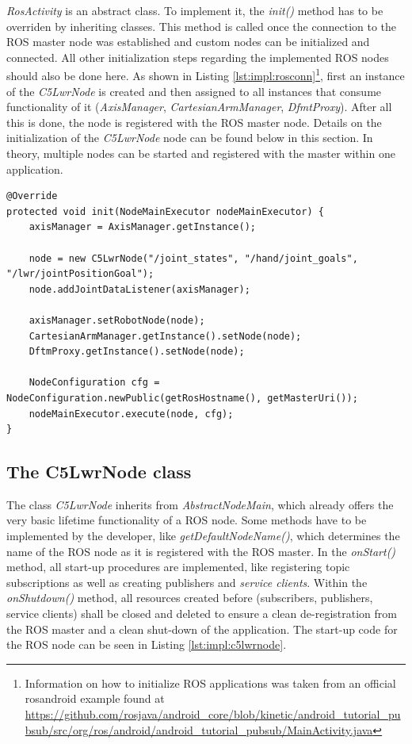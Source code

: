\textit{RosActivity} is an abstract class. To implement it, the \textit{init()} method has to be overriden by inheriting classes. This method is called once the connection to the ROS master node was established and custom nodes can be initialized and connected. All other initialization steps regarding the implemented ROS nodes should also be done here. As shown in Listing \ref{lst:impl:rosconn}\footnote{Information on how to initialize ROS applications was taken from an official rosandroid example found at \url{https://github.com/rosjava/android_core/blob/kinetic/android_tutorial_pubsub/src/org/ros/android/android_tutorial_pubsub/MainActivity.java}}, first an instance of the \textit{C5LwrNode} is created and then assigned to all instances that consume functionality of it (\textit{AxisManager}, \textit{CartesianArmManager}, \textit{DfmtProxy}). After all this is done, the node is registered with the ROS master node. Details on the initialization of the \textit{C5LwrNode} node can be found below in this section. In theory, multiple nodes can be started and registered with the master within one application.

\begin{lstlisting}[caption={Initialization of the ROS connection}, label={lst:impl:rosconn}]
@Override
protected void init(NodeMainExecutor nodeMainExecutor) {
	axisManager = AxisManager.getInstance();
	
	node = new C5LwrNode("/joint_states", "/hand/joint_goals", "/lwr/jointPositionGoal");
	node.addJointDataListener(axisManager);
	
	axisManager.setRobotNode(node);
	CartesianArmManager.getInstance().setNode(node);
	DftmProxy.getInstance().setNode(node);

	NodeConfiguration cfg = NodeConfiguration.newPublic(getRosHostname(), getMasterUri());
	nodeMainExecutor.execute(node, cfg);
}
\end{lstlisting}

\subsection{The C5LwrNode class}

The class \textit{C5LwrNode} inherits from \textit{AbstractNodeMain}, which already offers the very basic lifetime functionality of a ROS node. Some methods have to be implemented by the developer, like \textit{getDefaultNodeName()}, which determines the name of the ROS node as it is registered with the ROS master. In the \textit{onStart()} method, all start-up procedures are implemented, like registering topic subscriptions as well as creating publishers and \textit{service clients}. Within the \textit{onShutdown()} method, all resources created before (subscribers, publishers, service clients) shall be closed and deleted to ensure a clean de-registration from the ROS master and a clean shut-down of the application. The start-up code for the ROS node can be seen in Listing \ref{lst:impl:c5lwrnode}.

